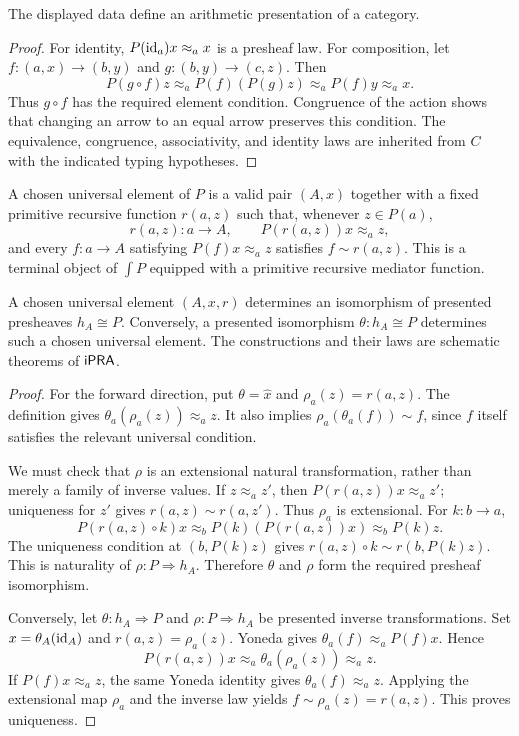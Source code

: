 \begin{lemma}
The displayed data define an arithmetic presentation of a category.
\end{lemma}
\begin{proof}
For identity, $P(\operatorname{id}_a)x\approx_a x$ is a presheaf law.  For composition,
let $f:(a,x)\to(b,y)$ and $g:(b,y)\to(c,z)$.  Then
\[
 P(g\circ f)z\approx_a P(f)(P(g)z)
 \approx_a P(f)y\approx_a x.
\]
Thus $g\circ f$ has the required element condition.  Congruence of the action
shows that changing an arrow to an equal arrow preserves this condition.
The equivalence, congruence, associativity, and identity laws are inherited
from $C$ with the indicated typing hypotheses.
\end{proof}

\begin{definition}
A chosen universal element of $P$ is a valid pair $(A,x)$ together with a
fixed primitive recursive function $r(a,z)$ such that, whenever $z\in P(a)$,
\[
 r(a,z):a\to A,\qquad P(r(a,z))x\approx_a z,
\]
and every $f:a\to A$ satisfying $P(f)x\approx_a z$ satisfies
$f\sim r(a,z)$.  This is a terminal object of $\int P$ equipped with a
primitive recursive mediator function.
\end{definition}

\begin{theorem}
A chosen universal element $(A,x,r)$ determines an isomorphism of presented
presheaves $h_A\cong P$.  Conversely, a presented isomorphism
$\theta:h_A\cong P$ determines such a chosen universal element.  The
constructions and their laws are schematic theorems of $\mathsf{iPRA}$.
\end{theorem}
\begin{proof}
For the forward direction, put $\theta=\widehat{x}$ and
$\rho_a(z)=r(a,z)$.  The definition gives
$\theta_a(\rho_a(z))\approx_a z$.  It also implies
$\rho_a(\theta_a(f))\sim f$, since $f$ itself satisfies the relevant
universal condition.

We must check that $\rho$ is an extensional natural transformation, rather
than merely a family of inverse values.  If $z\approx_a z'$, then
$P(r(a,z))x\approx_a z'$; uniqueness for $z'$ gives
$r(a,z)\sim r(a,z')$.  Thus $\rho_a$ is extensional.  For $k:b\to a$,
\[
 P(r(a,z)\circ k)x
 \approx_b P(k)(P(r(a,z))x)
 \approx_b P(k)z.
\]
The uniqueness condition at $(b,P(k)z)$ gives
$r(a,z)\circ k\sim r(b,P(k)z)$.  This is naturality of $\rho:P\Rightarrow h_A$.
Therefore $\theta$ and $\rho$ form the required presheaf isomorphism.

Conversely, let $\theta:h_A\Rightarrow P$ and $\rho:P\Rightarrow h_A$ be
presented inverse transformations.  Set $x=\theta_A(\operatorname{id}_A)$ and
$r(a,z)=\rho_a(z)$.  Yoneda gives
$\theta_a(f)\approx_a P(f)x$.  Hence
\[
 P(r(a,z))x\approx_a\theta_a(\rho_a(z))\approx_a z.
\]
If $P(f)x\approx_a z$, the same Yoneda identity gives
$\theta_a(f)\approx_a z$.  Applying the extensional map $\rho_a$ and the
inverse law yields $f\sim\rho_a(z)=r(a,z)$.  This proves uniqueness.
\end{proof}

